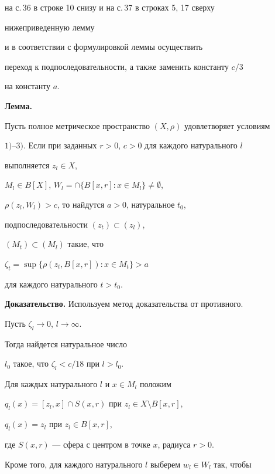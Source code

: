 на с.\,36 в строке 10 снизу и на с.\,37 в строках 5, 17 сверху 


нижеприведенную лемму 


и в соответствии с формулировкой леммы осуществить 


переход к подпоследовательности, а также заменить константу $c/3$ 


на константу $a$. 


\medskip





{\bf Лемма.} {\it


Пусть полное метрическое пространство $(X,\rho)$ удовлетворяет условиям 


$1)$--$3)$. Если при заданных $r>0$, $c>0$ для каждого натурального $l$ 


выполняется $z_{l} \in X$,


$M_{l} \in B[X]$, $W_{l} = \cap \{B[x,r] : x \in M_{l} \} \neq \emptyset$,


$\rho (z_{l},W_{l}) > c$, то найдутся $a > 0$, натуральное $t_{0}$, 


подпоследовательности $(z_{t}) \subset (z_{l})$,


$(M_{t}) \subset (M_{l})$ такие, что


$\zeta _{t} = \sup \{ \rho (z_{t},B[x,r]) : x \in M_{t} \} > a$


для каждого натурального $t > t_{0}$.


}


\medskip





{\bf Доказательство.} Используем метод доказательства от противного.


Пусть $\zeta _{l} \rightarrow 0$, $l \rightarrow \infty$.


Тогда найдется натуральное число


$l_{0}$ такое, что $\zeta _{l} < c/18$ при $l > l_{0}$. 





Для каждых натурального $l$ и $x \in M_{l}$ положим


$q_{l}(x) = [z_{l},x]\cap S(x,r)$ при $ z_{l} \in X \setminus B[x,r]$,


$q_{l}(x) = z_{l}$ при $z_{l} \in B[x,r]$,


где $S(x,r)$ --- сфера с центром в точке $x$, радиуса $r>0$.


Кроме того, для каждого натурального $l$ выберем $w_{l} \in W_{l}$ так, чтобы 


